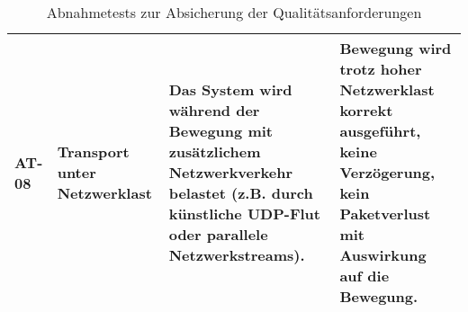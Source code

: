 \begin{table}[h!]
\begin{tabular}{p{1.6cm}|p{4cm}|p{5.5cm}|p{5.5cm}}
\hline
AT-08 & Transport unter Netzwerklast & Das System wird während der Bewegung mit zusätzlichem Netzwerkverkehr belastet (z.B. durch künstliche UDP-Flut oder parallele Netzwerkstreams). & Bewegung wird trotz hoher Netzwerklast korrekt ausgeführt, keine Verzögerung, kein Paketverlust mit Auswirkung auf die Bewegung. \\
\hline
\end{tabular}
\caption{Abnahmetests zur Absicherung der Qualitätsanforderungen}
\label{tab:abnahmetests}
\end{table}
